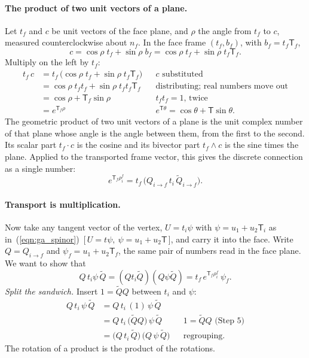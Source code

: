 \paragraph{The product of two unit vectors of a plane.} Let $t_f$ and $c$ be unit vectors of the face plane, and $\rho$ the angle from $t_f$ to $c$, measured counterclockwise about $n_f$. In the face frame $(t_f, b_f)$, with $b_f = t_f\mathsf T_f$,
\begin{equation*}
c = \cos\rho\; t_f + \sin\rho\; b_f = \cos\rho\; t_f + \sin\rho\; t_f\mathsf T_f .
\end{equation*}
Multiply on the left by $t_f$:
\begin{align*}
t_f\, c &= t_f\,\big(\cos\rho\; t_f + \sin\rho\; t_f\mathsf T_f\big) && c \text{ substituted} \\
&= \cos\rho\; t_f t_f + \sin\rho\; t_f t_f \mathsf T_f && \text{distributing; real numbers move out} \\
&= \cos\rho + \mathsf T_f\sin\rho && t_f t_f = 1 \text{, twice} \\
&= e^{\mathsf T_f\rho} && e^{\mathsf T\theta} = \cos\theta + \mathsf T\sin\theta .
\end{align*}
The geometric product of two unit vectors of a plane is the unit complex number of that plane whose angle is the angle between them, from the first to the second. Its scalar part $t_f\cdot c$ is the cosine and its bivector part $t_f\wedge c$ is the sine times the plane. Applied to the transported frame vector, this gives the discrete connection as a single number:
\begin{equation}
\label{eqn:ga_connection}
e^{\mathsf T_f \rho_i^f} = t_f\, \big( Q_{i \to f}\, t_i\, \widetilde Q_{i \to f} \big).
\end{equation}

\paragraph{Transport is multiplication.} Now take any tangent vector of the vertex, $U = t_i\psi$ with $\psi = u_1 + u_2\mathsf T_i$ as in~(\ref{eqn:ga_spinor})~[\,$U = t\psi,\ \psi = u_1 + u_2\mathsf T$\,], and carry it into the face. Write $Q = Q_{i\to f}$ and $\psi_f = u_1 + u_2 \mathsf T_f$, the same pair of numbers read in the face plane. We want to show that
\begin{equation}
\label{eqn:ga_transport}
Q\, t_i \psi\, \widetilde Q = (Q t_i \widetilde Q)(Q \psi \widetilde Q) = t_f\, e^{\mathsf T_f \rho_i^f}\, \psi_f .
\end{equation}
\emph{Split the sandwich.} Insert $1 = \widetilde Q Q$ between $t_i$ and $\psi$:
\begin{align*}
Q\, t_i\, \psi\, \widetilde Q &= Q\, t_i\, (1)\, \psi\, \widetilde Q && \\
&= Q\, t_i\, \big(\widetilde Q Q\big)\, \psi\, \widetilde Q && 1 = \widetilde Q Q \text{ (Step 5)} \\
&= \big(Q\, t_i\, \widetilde Q\big)\,\big(Q\, \psi\, \widetilde Q\big) && \text{regrouping.}
\end{align*}
The rotation of a product is the product of the rotations.

